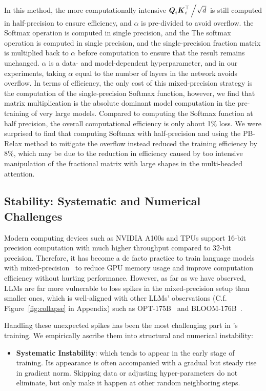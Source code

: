 {{In this method, the more computationally intensive $\boldsymbol{Q}_i\boldsymbol{K}_i^{\top}\left/\sqrt{d}\right.$ is still computed in half-precision to ensure efficiency, and $\alpha$ is pre-divided to avoid overflow. the Softmax operation is computed in single precision, and the The softmax operation is computed in single precision, and the single-precision fraction matrix is multiplied back to $\alpha$ before computation to ensure that the result remains unchanged. $\alpha$ is a data- and model-dependent hyperparameter, and in our experiments, taking $\alpha$ equal to the number of layers in the network avoids overflow. In terms of efficiency, the only cost of this mixed-precision strategy is the computation of the single-precision Softmax function, however, we find that matrix multiplication is the absolute dominant model computation in the pre-training of very large models. Compared to computing the Softmax function at half precision, the overall computational efficiency is only about 1\% loss. We were surprised to find that computing Softmax with half-precision and using the PB-Relax method to mitigate the overflow instead reduced the training efficiency by 8\%, which may be due to the reduction in efficiency caused by too intensive manipulation of the fractional matrix with large shapes in the multi-headed attention.
}
\subsection{Stability: Systematic and Numerical Challenges}

 Modern computing devices such as NVIDIA A100s and TPUs support 16-bit precision computation with much higher throughput compared to 32-bit precision. 
Therefore, it has become a de facto practice to train language models with mixed-precision~\citep{micikevicius2018mixed} to reduce GPU memory usage and improve computation efficiency without hurting performance. 
However, as far as we have observed, LLMs are far more vulnerable to loss spikes in the mixed-precision setup than smaller ones, which is well-aligned with other LLMs' observations (C.f. Figure~\ref{fig:collapse} in Appendix) such as OPT-175B~\citep{zhang2022opt} and BLOOM-176B~\citep{scao2022what}.

Handling these unexpected spikes has been the most challenging part in \glm's training. 
We empirically ascribe them into structural and numerical instability:

\begin{itemize}[leftmargin=*,itemsep=0pt,parsep=0.2em,topsep=0.0em,partopsep=0.0em]
\item \textbf{Systematic Instability}:
which tends to appear in the early stage of training. 
Its appearance is often accompanied with a gradual but steady rise in gradient norm. 
Skipping data or adjusting hyper-parameters do not eliminate, but only make it happen at other random neighboring steps. 


\end{itemize}}
